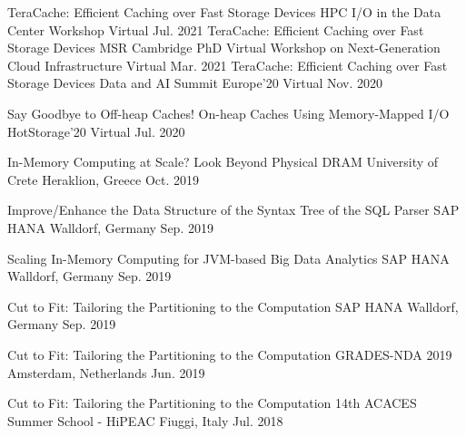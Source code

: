 

\begin{cvhonors}
  \cvhonor
    {TeraCache: Efficient Caching over Fast Storage Devices} %
    {HPC I/O in the Data Center Workshop} %
    {Virtual} %
    {Jul. 2021} %
  \cvhonor
    {TeraCache: Efficient Caching over Fast Storage Devices} %
    {MSR Cambridge PhD Virtual Workshop on Next-Generation Cloud Infrastructure} %
    {Virtual} %
    {Mar. 2021} %
  \cvhonor
    {TeraCache: Efficient Caching over Fast Storage Devices} %
    {Data and AI Summit Europe'20} %
    {Virtual} %
    {Nov. 2020} %

  \cvhonor
    {Say Goodbye to Off-heap Caches! On-heap Caches Using Memory-Mapped I/O} %
    {HotStorage'20} %
    {Virtual} %
    {Jul. 2020} %

  \cvhonor
    {In-Memory Computing at Scale? Look Beyond Physical DRAM} %
    {University of Crete} %
    {Heraklion, Greece} %
    {Oct. 2019} %

  \cvhonor
    {Improve/Enhance the Data Structure of the Syntax Tree of the SQL Parser} %
    {SAP HANA} %
    {Walldorf, Germany} %
    {Sep. 2019} %


  \cvhonor
    {Scaling In-Memory Computing for JVM-based Big Data Analytics} %
    {SAP HANA} %
    {Walldorf, Germany} %
    {Sep. 2019} %

  \cvhonor
    {Cut to Fit: Tailoring the Partitioning to the Computation} %
    {SAP HANA} %
    {Walldorf, Germany} %
    {Sep. 2019} %

  \cvhonor
    {Cut to Fit: Tailoring the Partitioning to the Computation} %
    {GRADES-NDA 2019} %
    {Amsterdam, Netherlands} %
    {Jun. 2019} %

  \cvhonor
    {Cut to Fit: Tailoring the Partitioning to the Computation} %
    {14th ACACES Summer School - HiPEAC} %
    {Fiuggi, Italy} %
    {Jul. 2018} %

\end{cvhonors}
